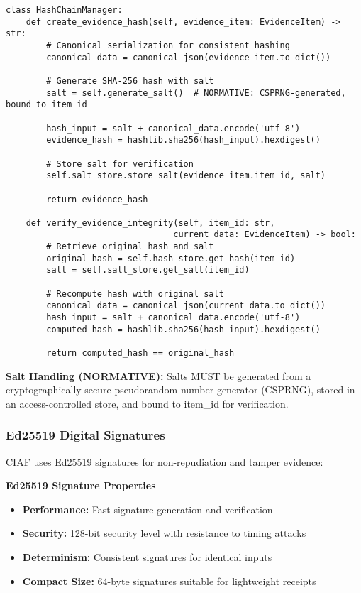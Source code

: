 \documentclass[12pt,a4paper]{article}
\begin{document}
\begin{lstlisting}[caption=Hash Chain Implementation]
class HashChainManager:
    def create_evidence_hash(self, evidence_item: EvidenceItem) -> str:
        # Canonical serialization for consistent hashing
        canonical_data = canonical_json(evidence_item.to_dict())
        
        # Generate SHA-256 hash with salt
        salt = self.generate_salt()  # NORMATIVE: CSPRNG-generated, bound to item_id

        hash_input = salt + canonical_data.encode('utf-8')
        evidence_hash = hashlib.sha256(hash_input).hexdigest()
        
        # Store salt for verification
        self.salt_store.store_salt(evidence_item.item_id, salt)
        
        return evidence_hash
    
    def verify_evidence_integrity(self, item_id: str, 
                                 current_data: EvidenceItem) -> bool:
        # Retrieve original hash and salt
        original_hash = self.hash_store.get_hash(item_id)
        salt = self.salt_store.get_salt(item_id)
        
        # Recompute hash with original salt
        canonical_data = canonical_json(current_data.to_dict())
        hash_input = salt + canonical_data.encode('utf-8')
        computed_hash = hashlib.sha256(hash_input).hexdigest()
        
        return computed_hash == original_hash
\end{lstlisting}

\textbf{Salt Handling (NORMATIVE):} Salts MUST be generated from a cryptographically secure pseudorandom number generator (CSPRNG), stored in an access-controlled store, and bound to item\_id for verification.

\subsubsection{Ed25519 Digital Signatures}

CIAF uses Ed25519 signatures for non-repudiation and tamper evidence:

\begin{technicalbox}
\textbf{Ed25519 Signature Properties}
\begin{itemize}
\item \textbf{Performance:} Fast signature generation and verification
\item \textbf{Security:} 128-bit security level with resistance to timing attacks
\item \textbf{Determinism:} Consistent signatures for identical inputs
\item \textbf{Compact Size:} 64-byte signatures suitable for lightweight receipts
\end{itemize}
\end{technicalbox}
\end{document}
